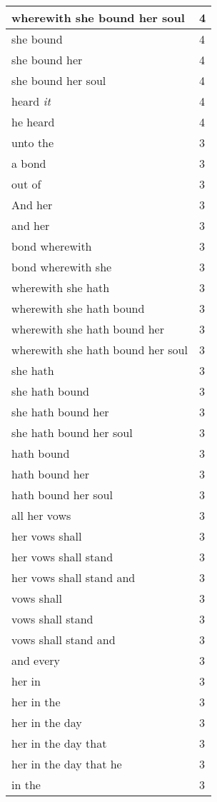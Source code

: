 \begin{center}
\begin{longtable}{|p{3.0in}|p{0.5in}|}
wherewith she bound her soul & 4\\ \hline 
she bound & 4\\ \hline 
she bound her & 4\\ \hline 
she bound her soul & 4\\ \hline 
heard \emph{it} & 4\\ \hline 
he heard & 4\\ \hline 
unto the & 3\\ \hline 
a bond & 3\\ \hline 
out of & 3\\ \hline 
And her & 3\\ \hline 
and her & 3\\ \hline 
bond wherewith & 3\\ \hline 
bond wherewith she & 3\\ \hline 
wherewith she hath & 3\\ \hline 
wherewith she hath bound & 3\\ \hline 
wherewith she hath bound her & 3\\ \hline 
wherewith she hath bound her soul & 3\\ \hline 
she hath & 3\\ \hline 
she hath bound & 3\\ \hline 
she hath bound her & 3\\ \hline 
she hath bound her soul & 3\\ \hline 
hath bound & 3\\ \hline 
hath bound her & 3\\ \hline 
hath bound her soul & 3\\ \hline 
all her vows & 3\\ \hline 
her vows shall & 3\\ \hline 
her vows shall stand & 3\\ \hline 
her vows shall stand and & 3\\ \hline 
vows shall & 3\\ \hline 
vows shall stand & 3\\ \hline 
vows shall stand and & 3\\ \hline 
and every & 3\\ \hline 
her in & 3\\ \hline 
her in the & 3\\ \hline 
her in the day & 3\\ \hline 
her in the day that & 3\\ \hline 
her in the day that he & 3\\ \hline 
in the & 3\\ \hline 

\end{longtable}
\end{center}
